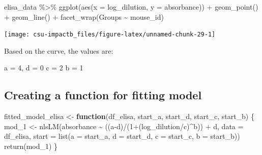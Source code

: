 \documentclass[
]{book}
\newenvironment{Shaded}{\begin{snugshade}}{\end{snugshade}}
\newcommand{\AttributeTok}[1]{\textcolor[rgb]{0.77,0.63,0.00}{#1}}
\newcommand{\ControlFlowTok}[1]{\textcolor[rgb]{0.13,0.29,0.53}{\textbf{#1}}}
\newcommand{\DecValTok}[1]{\textcolor[rgb]{0.00,0.00,0.81}{#1}}
\newcommand{\FunctionTok}[1]{\textcolor[rgb]{0.00,0.00,0.00}{#1}}
\newcommand{\NormalTok}[1]{#1}
\newcommand{\OtherTok}[1]{\textcolor[rgb]{0.56,0.35,0.01}{#1}}
\newcommand{\SpecialCharTok}[1]{\textcolor[rgb]{0.00,0.00,0.00}{#1}}
\begin{document}
\begin{Shaded}
\begin{Highlighting}[]
\NormalTok{elisa\_data }\SpecialCharTok{\%\textgreater{}\%}
  \FunctionTok{ggplot}\NormalTok{(}\FunctionTok{aes}\NormalTok{(}\AttributeTok{x =}\NormalTok{ log\_dilution, }\AttributeTok{y =}\NormalTok{ absorbance)) }\SpecialCharTok{+}
  \FunctionTok{geom\_point}\NormalTok{() }\SpecialCharTok{+}
  \FunctionTok{geom\_line}\NormalTok{() }\SpecialCharTok{+} 
  \FunctionTok{facet\_wrap}\NormalTok{(Groups }\SpecialCharTok{\textasciitilde{}}\NormalTok{ mouse\_id)}
\end{Highlighting}
\end{Shaded}

\begin{center}\texttt{[image: csu-impactb\_files/figure-latex/unnamed-chunk-29-1]} \end{center}

Based on the curve, the values are:

a = 4,
d = 0
c = 2
b = 1

\hypertarget{creating-a-function-for-fitting-model}{%
\subsection{Creating a function for fitting model}\label{creating-a-function-for-fitting-model}}

\begin{Shaded}
\begin{Highlighting}[]
\NormalTok{fitted\_model\_elisa }\OtherTok{\textless{}{-}} \ControlFlowTok{function}\NormalTok{(df\_elisa, }
\NormalTok{                               start\_a, start\_d, }
\NormalTok{                               start\_c, start\_b) \{}
\NormalTok{  mod\_1 }\OtherTok{\textless{}{-}} \FunctionTok{nlsLM}\NormalTok{(absorbance }\SpecialCharTok{\textasciitilde{}} 
\NormalTok{                   ((a}\SpecialCharTok{{-}}\NormalTok{d)}\SpecialCharTok{/}\NormalTok{(}\DecValTok{1}\SpecialCharTok{+}\NormalTok{(log\_dilution}\SpecialCharTok{/}\NormalTok{c)}\SpecialCharTok{\^{}}\NormalTok{b)) }\SpecialCharTok{+}\NormalTok{ d,}
\AttributeTok{data =}\NormalTok{ df\_elisa,}
\AttributeTok{start =} \FunctionTok{list}\NormalTok{(}\AttributeTok{a =}\NormalTok{ start\_a, }\AttributeTok{d =}\NormalTok{ start\_d, }\AttributeTok{c =}\NormalTok{ start\_c, }\AttributeTok{b =}\NormalTok{ start\_b))}
  \FunctionTok{return}\NormalTok{(mod\_1)}
\NormalTok{\}}
\end{Highlighting}
\end{Shaded}
\end{document}
